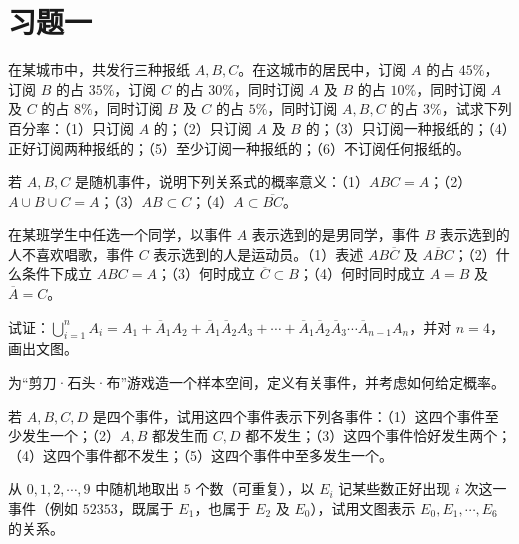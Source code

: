 \documentclass[../../main.tex]{subfiles}
\begin{document}
\section*{习题一}\label{section:ch01-习题一}

\begin{exercise}\label{exercise:ch01-01}
在某城市中，共发行三种报纸 $A,B,C$。在这城市的居民中，订阅 $A$ 的占 $45\%$，订阅 $B$ 的占 $35\%$，订阅 $C$ 的占 $30\%$，同时订阅 $A$ 及 $B$ 的占 $10\%$，同时订阅 $A$ 及 $C$ 的占 $8\%$，同时订阅 $B$ 及 $C$ 的占 $5\%$，同时订阅 $A,B,C$ 的占 $3\%$，试求下列百分率：（1）只订阅 $A$ 的；（2）只订阅 $A$ 及 $B$ 的；（3）只订阅一种报纸的；（4）正好订阅两种报纸的；（5）至少订阅一种报纸的；（6）不订阅任何报纸的。
\end{exercise}

\begin{exercise}\label{exercise:ch01-02}
若 $A,B,C$ 是随机事件，说明下列关系式的概率意义：（1）$ABC=A$；（2）$A\cup B\cup C=A$；（3）$AB\subset C$；（4）$A\subset\overline{BC}$。
\end{exercise}

\begin{exercise}\label{exercise:ch01-03}
在某班学生中任选一个同学，以事件 $A$ 表示选到的是男同学，事件 $B$ 表示选到的人不喜欢唱歌，事件 $C$ 表示选到的人是运动员。（1）表述 $AB\overline{C}$ 及 $A\overline{B}C$；（2）什么条件下成立 $ABC=A$；（3）何时成立 $\overline{C}\subset B$；（4）何时同时成立 $A=B$ 及 $\overline{A}=C$。
\end{exercise}

\begin{exercise}\label{exercise:ch01-04}
试证：$\bigcup_{i=1}^{n}A_i=A_1+\overline{A}_1A_2+\overline{A}_1\overline{A}_2A_3+\cdots+\overline{A}_1\overline{A}_2\overline{A}_3\cdots\overline{A}_{n-1}A_n$，并对 $n=4$，画出文图。
\end{exercise}

\begin{exercise}\label{exercise:ch01-05}
为``剪刀·石头·布''游戏造一个样本空间，定义有关事件，并考虑如何给定概率。
\end{exercise}

\begin{exercise}\label{exercise:ch01-06}
若 $A,B,C,D$ 是四个事件，试用这四个事件表示下列各事件：（1）这四个事件至少发生一个；（2）$A,B$ 都发生而 $C,D$ 都不发生；（3）这四个事件恰好发生两个；（4）这四个事件都不发生；（5）这四个事件中至多发生一个。
\end{exercise}

\begin{exercise}\label{exercise:ch01-07}
从 $0,1,2,\cdots,9$ 中随机地取出 $5$ 个数（可重复），以 $E_i$ 记某些数正好出现 $i$ 次这一事件（例如 $52353$，既属于 $E_1$，也属于 $E_2$ 及 $E_0$），试用文图表示 $E_0,E_1,\cdots,E_6$ 的关系。
\end{exercise}
\end{document}
